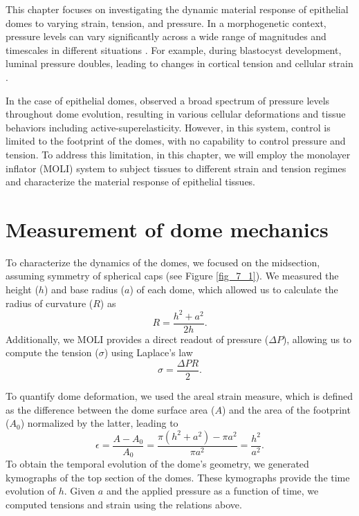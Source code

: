 This chapter focuses on investigating the dynamic material response of epithelial domes to varying strain, tension, and pressure. In a morphogenetic context, pressure levels can vary significantly across a wide range of magnitudes and timescales in different situations \cite{torres-sanchez2021, choudhury2022a}. For example, during blastocyst development, luminal pressure doubles, leading to changes in cortical tension and cellular strain \cite{chan2019}.

In the case of epithelial domes, \citet{latorre2018} observed a broad spectrum of pressure levels throughout dome evolution, resulting in various cellular deformations and tissue behaviors including active-superelasticity. However, in this system, control is limited to the footprint of the domes, with no capability to control pressure and tension. To address this limitation, in this chapter, we will employ the monolayer inflator (MOLI) system to subject tissues to different strain and tension regimes and characterize the material response of epithelial tissues.

\hypertarget{measurement-of-dome-mechanics}{%
	\section{Measurement of dome mechanics}\label{measurement-of-dome-mechanics}}

To characterize the dynamics of the domes, we focused on the midsection, assuming symmetry of spherical caps (see Figure \ref{fig_7_1}). We measured the height ($h$) and base radius ($a$) of each dome, which allowed us to calculate the radius of curvature ($R$)  as
\begin{equation}
	\label{eqn:radiuscurve}
	R = \frac{h^2 + a^2}{2h}.
\end{equation}
Additionally, we MOLI provides a direct readout of pressure ($\Delta P$), allowing us to compute the tension ($\sigma$) using Laplace's law
\begin{equation}
	\label{eqn:laplace}
	\sigma = \frac{\Delta PR }{2} .
\end{equation}

To quantify dome deformation, we used the areal strain measure, which is defined as the difference between the dome surface area ($A$) and the area of the footprint ($A_{0}$) normalized by the latter, leading to
\begin{equation}
	\label{eqn:arealstrain}
	\epsilon = \frac{A - A_{0}}{A_{0}} = \frac{\pi(h^2 + a^2) - \pi a^2}{\pi a^2} = \frac{h^2}{a^2} .
\end{equation}
To obtain the temporal evolution of the dome’s geometry, we generated kymographs of the top section of the domes. These kymographs provide the time evolution of $h$. Given $a$ and the applied pressure as a function of time, we computed tensions and strain using the relations above.

